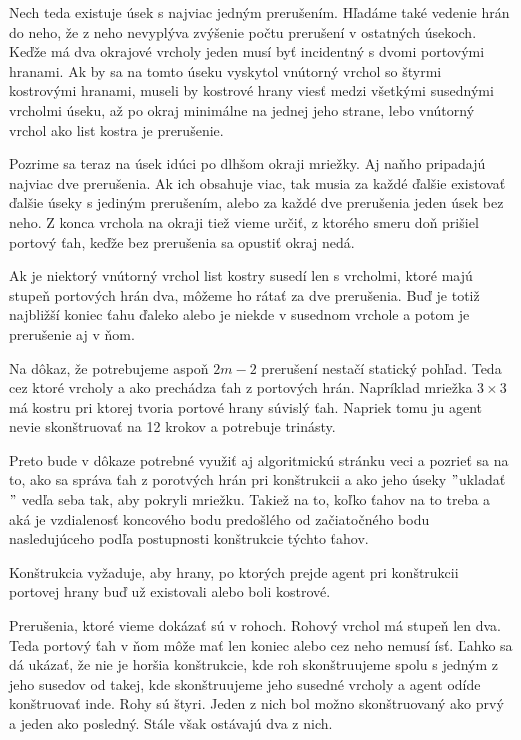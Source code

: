 Nech teda existuje úsek s najviac jedným prerušením. Hľadáme také vedenie
hrán do neho, že z neho nevyplýva zvýšenie počtu prerušení v ostatných
úsekoch. Keďže má dva okrajové vrcholy jeden musí byť incidentný s dvomi
portovými hranami. Ak by sa na tomto úseku vyskytol vnútorný vrchol so
štyrmi kostrovými hranami, museli by kostrové hrany viesť medzi všetkými
susednými vrcholmi úseku, až po okraj minimálne na jednej jeho strane, lebo
vnútorný vrchol ako list kostra je prerušenie.

Pozrime sa teraz na úsek idúci po dlhšom okraji mriežky. Aj naňho pripadajú
najviac dve prerušenia. Ak ich obsahuje viac, tak musia za každé ďalšie
existovať ďalšie úseky s jediným prerušením, alebo za každé dve prerušenia
jeden úsek bez neho. Z konca vrchola na okraji tiež vieme určiť, z ktorého
smeru doň prišiel portový ťah, keďže bez prerušenia sa opustiť okraj nedá.

Ak je niektorý vnútorný vrchol list kostry susedí len s vrcholmi, 
ktoré majú stupeň portových hrán dva, môžeme
ho rátať za dve prerušenia. Buď je totiž najbližší koniec ťahu ďaleko alebo
je niekde v  susednom vrchole a potom je prerušenie aj v ňom.

Na dôkaz, že potrebujeme aspoň $2m - 2$ prerušení nestačí statický pohľad. Teda
cez ktoré vrcholy a ako prechádza ťah z portových hrán. Napríklad mriežka $3
\times 3$ má kostru pri ktorej tvoria portové hrany súvislý ťah. Napriek
tomu ju agent nevie skonštruovať na 12 krokov a potrebuje trinásty.

Preto bude v dôkaze potrebné využiť aj algoritmickú stránku veci a pozrieť
sa na to, ako sa správa ťah z porotvých hrán pri konštrukcii a ako jeho
úseky $"$ukladať$"$ vedľa seba tak, aby pokryli mriežku. Takiež na to, koľko
ťahov na to treba a aká je vzdialenosť koncového bodu predošlého od
začiatočného bodu nasledujúceho podľa postupnosti konštrukcie týchto ťahov.

Konštrukcia vyžaduje, aby hrany, po ktorých prejde agent pri konštrukcii
portovej hrany buď už existovali alebo boli kostrové.

Prerušenia, ktoré vieme dokázať sú v rohoch. Rohový vrchol má stupeň len
dva. Teda portový ťah v ňom môže mať len koniec alebo cez neho nemusí ísť.
Ľahko sa dá ukázať, že nie je horšia konštrukcie, kde roh skonštruujeme
spolu s jedným z jeho susedov od takej, kde skonštruujeme jeho susedné
vrcholy a agent odíde konštruovať inde. Rohy sú štyri. Jeden z nich bol
možno skonštruovaný ako prvý a jeden ako posledný. Stále však ostávajú dva z
nich.

